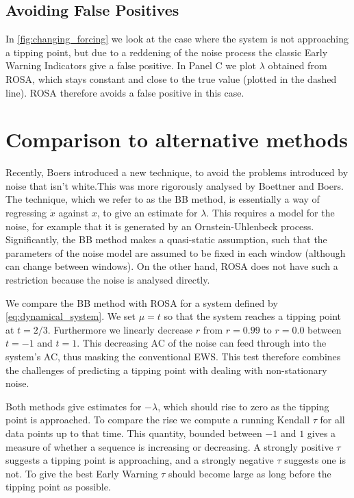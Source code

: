 \subsection{Avoiding False Positives}
In \cref{fig:changing_forcing} we look at the case where the 
system is not approaching a tipping point, but due to a reddening of 
the noise process the classic Early Warning Indicators give a 
false positive. In Panel C we plot $\lambda$ obtained from ROSA, which stays constant and close to the true
value (plotted in the dashed line). ROSA therefore avoids a false positive in this case.




\section{Comparison to alternative methods}
Recently, Boers\cite{Boers2021a} introduced a new technique,
to avoid the problems introduced by noise that isn't white.This was
more rigorously analysed by Boettner and Boers\cite{Boettner2022}. The
technique, which we refer to as the BB method, is essentially a way of
regressing $\dot{x}$ against $x$, to give an estimate for $\lambda$. 
This requires a model for the noise, for example that it is
generated by an Ornstein-Uhlenbeck process. Significantly, the BB method makes a quasi-static assumption, such that the parameters of the noise
model are assumed to be fixed in each window (although can change between windows). On the other hand,
ROSA does not have such a restriction because the noise is analysed directly.

We compare the BB method with ROSA for a system defined by
\cref{eq:dynamical_system}. We set $\mu  = t$ so that the system
reaches a tipping point at $t=2/3$. Furthermore we linearly decrease
$r$ from $r=0.99$ to $r=0.0$ between $t=-1$ and $t=1$.
This decreasing AC of the
noise can feed through into the system's AC, thus masking
the conventional EWS. This test therefore
combines the challenges of predicting a tipping point with dealing
with non-stationary noise.

Both methods give estimates for $-\lambda$, which should rise
to zero as the tipping point is approached. To compare the 
rise we compute a running Kendall $\tau$\cite{Wilks2019} for all data points up to
that time. This quantity, bounded 
between $-1$ and $1$ gives a measure of whether a sequence is 
increasing or decreasing. A strongly positive $\tau$ suggests a tipping point is approaching, and a strongly
negative $\tau$ suggests one is not. To give the best Early Warning $\tau$ should become
large as long before the tipping point as possible.


